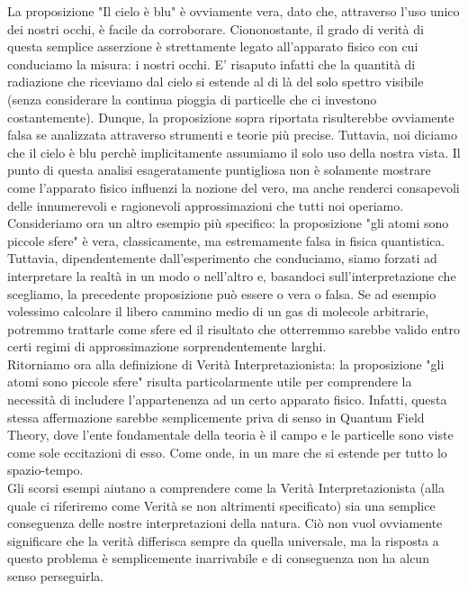 \documentclass[]{article}
\begin{document}
	La proposizione "Il cielo è blu" è ovviamente vera, dato che, attraverso l'uso unico dei nostri occhi, è facile da corroborare. Ciononostante, il grado di verità di questa semplice asserzione è strettamente legato all'apparato fisico con cui conduciamo la misura: i nostri occhi. E' risaputo infatti che la quantità di radiazione che riceviamo dal cielo si estende al di là del solo spettro visibile (senza considerare la continua pioggia di particelle che ci investono costantemente). Dunque, la proposizione sopra riportata risulterebbe ovviamente falsa se analizzata attraverso strumenti e teorie più precise. Tuttavia, noi diciamo che il cielo è blu perchè implicitamente assumiamo il solo uso della nostra vista. Il punto di questa analisi esageratamente puntigliosa non è solamente mostrare come l'apparato fisico influenzi la nozione del vero, ma anche renderci consapevoli delle innumerevoli e ragionevoli approssimazioni che tutti noi operiamo.\\
	Consideriamo ora un altro esempio più specifico: la proposizione "gli atomi sono piccole sfere" è vera, classicamente, ma estremamente falsa in fisica quantistica. Tuttavia, dipendentemente dall'esperimento che conduciamo, siamo forzati ad interpretare la realtà in un modo o nell'altro e, basandoci sull'interpretazione che scegliamo, la precedente proposizione può essere o vera o falsa. Se ad esempio volessimo calcolare il libero cammino medio di un gas di molecole arbitrarie, potremmo trattarle come sfere ed il risultato che otterremmo sarebbe valido entro certi regimi di approssimazione sorprendentemente larghi.\\
	Ritorniamo ora alla definizione di Verità Interpretazionista: la proposizione "gli atomi sono piccole sfere" risulta particolarmente utile per comprendere la necessità di includere l'appartenenza ad un certo apparato fisico. Infatti, questa stessa affermazione sarebbe semplicemente priva di senso in Quantum Field Theory, dove l'ente fondamentale della teoria è il campo e le particelle sono viste come sole eccitazioni di esso. Come onde, in un mare che si estende per tutto lo spazio-tempo.\\
	Gli scorsi esempi aiutano a comprendere come la Verità Interpretazionista (alla quale ci riferiremo come Verità se non altrimenti specificato) sia una semplice conseguenza delle nostre interpretazioni della natura. Ciò non vuol ovviamente significare che la verità differisca sempre da quella universale, ma la risposta a questo problema è semplicemente inarrivabile e di conseguenza non ha alcun senso perseguirla.\\
\end{document}

